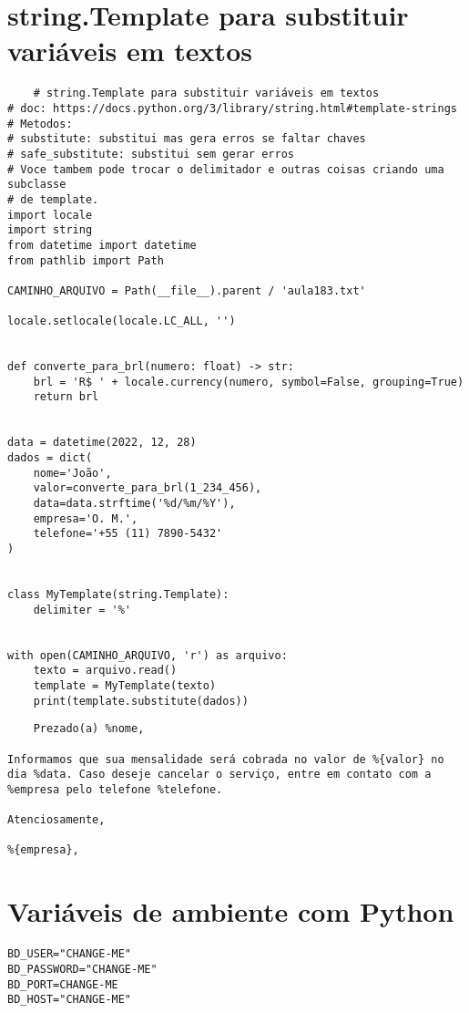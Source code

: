 \documentclass{article}
\begin{document}
\section{string.Template para substituir variáveis em textos}
\begin{lstlisting}
    # string.Template para substituir variáveis em textos
# doc: https://docs.python.org/3/library/string.html#template-strings
# Metodos:
# substitute: substitui mas gera erros se faltar chaves
# safe_substitute: substitui sem gerar erros
# Voce tambem pode trocar o delimitador e outras coisas criando uma subclasse
# de template.
import locale
import string
from datetime import datetime
from pathlib import Path

CAMINHO_ARQUIVO = Path(__file__).parent / 'aula183.txt'

locale.setlocale(locale.LC_ALL, '')


def converte_para_brl(numero: float) -> str:
    brl = 'R$ ' + locale.currency(numero, symbol=False, grouping=True)
    return brl


data = datetime(2022, 12, 28)
dados = dict(
    nome='João',
    valor=converte_para_brl(1_234_456),
    data=data.strftime('%d/%m/%Y'),
    empresa='O. M.',
    telefone='+55 (11) 7890-5432'
)


class MyTemplate(string.Template):
    delimiter = '%'


with open(CAMINHO_ARQUIVO, 'r') as arquivo:
    texto = arquivo.read()
    template = MyTemplate(texto)
    print(template.substitute(dados))
\end{lstlisting}
\begin{lstlisting}
    Prezado(a) %nome,

Informamos que sua mensalidade será cobrada no valor de %{valor} no dia %data. Caso deseje cancelar o serviço, entre em contato com a %empresa pelo telefone %telefone.

Atenciosamente,

%{empresa},
\end{lstlisting}


\section{ Variáveis de ambiente com Python}
\begin{lstlisting}
BD_USER="CHANGE-ME"
BD_PASSWORD="CHANGE-ME"
BD_PORT=CHANGE-ME
BD_HOST="CHANGE-ME"
\end{lstlisting}
\end{document}

